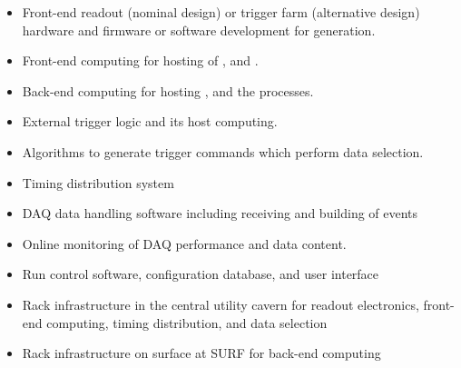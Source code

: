 \begin{itemize}
\item Front-end readout (nominal design) or trigger farm (alternative
  design) hardware and firmware or software development for
   generation.
\item Front-end computing for hosting of ,  and .
\item Back-end computing for hosting ,  and the  processes.
\item External trigger logic and its host computing.
\item Algorithms to generate trigger commands which perform data selection.
\item Timing distribution system
\item DAQ data handling software including receiving and building of
  events
\item Online monitoring of DAQ performance and data content.
\item Run control software, configuration database, and user interface
\item Rack infrastructure in the central utility cavern for readout
  electronics, front-end computing, timing distribution, and data
  selection
\item Rack infrastructure on surface at SURF for back-end computing
\end{itemize}
